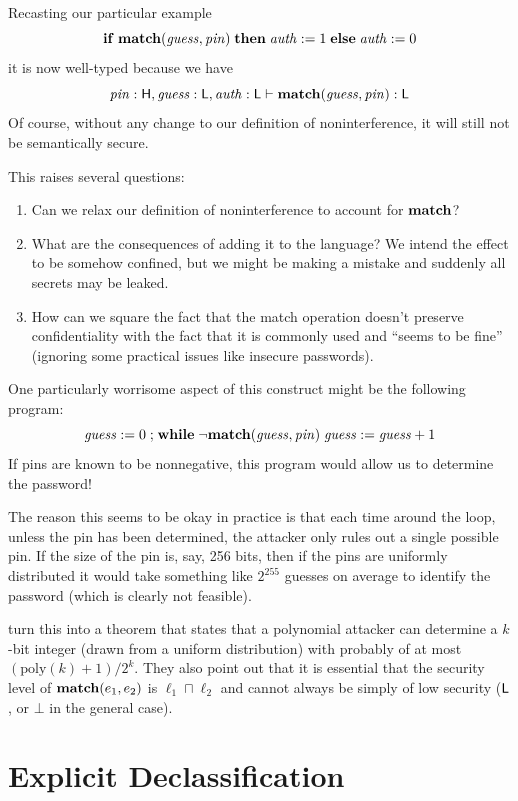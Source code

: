 \documentclass[11pt]{article}
\begin{document}
Recasting our particular example
\[
  \mathbf{if}\; \mathbf{match}(\mathit{guess}, \mathit{pin})\; \mathbf{then}\; \mathit{auth} := 1\; \mathbf{else}\; \mathit{auth} := 0
\]
it is now well-typed because we have
\[
  \mathit{pin}:\mathsf{H}, \mathit{guess}:\mathsf{L}, \mathit{auth}:\mathsf{L} \vdash
  \mathbf{match}(\mathit{guess}, \mathit{pin}) : \mathsf{L}
\]
Of course, without any change to our definition of noninterference, it will
still not be semantically secure.

This raises several questions:
\begin{enumerate}
\item Can we relax our definition of noninterference to account for $\mathbf{match}$?
\item What are the consequences of adding it to the language?  We intend the
  effect to be somehow confined, but we might be making a mistake and suddenly
  all secrets may be leaked.
\item How can we square the fact that the match operation doesn't preserve
  confidentiality with the fact that it is commonly used and ``seems to be
  fine'' (ignoring some practical issues like insecure passwords).
\end{enumerate}

One particularly worrisome aspect of this construct might be the following
program:
\[
  \mathit{guess} := 0 \mathrel{;} \mathbf{while}\; \lnot \mathbf{match}(\mathit{guess}, \mathit{pin})\;
  \mathit{guess} := \mathit{guess} + 1
\]
If pins are known to be nonnegative, this program would allow us to
determine the password!

The reason this seems to be okay in practice is that each time around the loop,
unless the pin has been determined, the attacker only rules out a single
possible pin.  If the size of the pin is, say, 256 bits, then if the pins are
uniformly distributed it would take something like $2^{255}$ guesses on average
to identify the password (which is clearly not feasible).

\citet{Volpano00popl} turn this into a theorem that states that a polynomial
attacker can determine a $k$-bit integer (drawn from a uniform distribution)
with probably of at most $(\mathrm{poly}(k)+1)/2^k$.  They also point out that
it is essential that the security level of $\mathbf{match}(e_1,e_2)$ is
$\ell_1 \sqcap \ell_2$ and cannot always be simply of low security ($\mathsf{L}$, or
$\bot$ in the general case).

\section{Explicit Declassification}
\label{sec:declassification}
\end{document}
